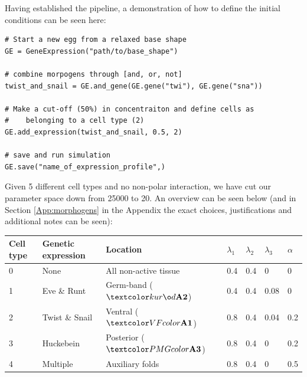 Having established the pipeline, a demonstration of how to define the initial conditions can be seen here:

\begin{lstlisting}
# Start a new egg from a relaxed base shape
GE = GeneExpression("path/to/base_shape")

# combine morpogens through [and, or, not]
twist_and_snail = GE.and_gene(GE.gene("twi"), GE.gene("sna"))

# Make a cut-off (50%) in concentraiton and define cells as 
#    belonging to a cell type (2) 
GE.add_expression(twist_and_snail, 0.5, 2) 

# save and run simulation
GE.save("name_of_expression_profile",)

\end{lstlisting}

Given 5 different cell types and no non-polar interaction, we have cut our parameter space down from 25000 to 20. An overview can be seen below (and in Section \ref{App:morphogens} in the Appendix the exact choices, justifications and additional notes can be seen):\\
\begin{table}[H]
\begin{tabular}{l|llllll}
Cell type & Genetic expression& Location & $\lambda_1$ & $\lambda_2$ & $\lambda_3$ & $\alpha$ \\ \hline
0         & None                                                                                           & All non-active tissue    & 0.4         & 0.4         & 0           & 0        \\
1         & Eve \& Runt                                                                                    & Germ-band ($\gb{A2}$)    & 0.4         & 0.4         & 0.08        & 0        \\
2         & Twist \& Snail                                                                                 & Ventral ($\vf{A1}$)      & 0.8         & 0.4         & 0.04        & 0.2     \\
3         & Huckebein                                                                                      & Posterior ($\pmg{A3}$)   & 0.8         & 0.4         & 0           & 0.2      \\
4         & Multiple                                                                                       & Auxiliary folds        & 0.8         & 0.4         & 0           & 0.5     
\end{tabular}
\end{table}


